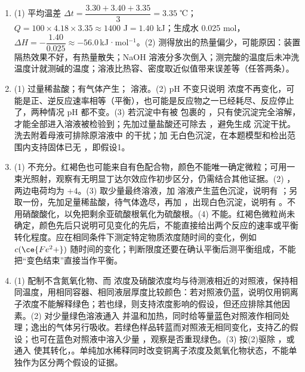 \documentclass[UTF8,a4paper,zihao=5,oneside,openany,fontset=none]{ctexbook}
\newenvironment{jiexilist}{\small\begin{enumerate}[label={\textbf{\arabic*}.},leftmargin=1.6em,itemsep=0.3em,topsep=0.2em]}{\end{enumerate}}
\newcommand{\kjmol}{\,kJ·mol$^{-1}$}
\begin{document}
\begin{jiexilist}
\item (1) 平均温差 $\Delta t=\dfrac{3.30+3.40+3.35}{3}=3.35$ ℃；$Q=100\times4.18\times3.35\approx1400$ J$=1.40$ kJ；生成水 0.025 mol，$\Delta H=-\dfrac{1.40}{0.025}\approx-56.0$\kjmol。(2) 测得放出的热量偏少，可能原因：装置隔热效果不好，有热量散失；NaOH 溶液分多次倒入；测完酸的温度后未冲洗温度计就测碱的温度；溶液比热容、密度取近似值带来误差等（任答两条）。
\item (1) 过量稀盐酸；有气体产生； 溶液。(2) pH 不变只说明  浓度不再变化，可能是正、逆反应速率相等（平衡），也可能是反应物之一已经耗尽、反应停止了，两种情况 pH 都不变。(3) 若沉淀中有被  包裹的 ，只有使沉淀完全溶解， 才能全部进入溶液被检验到；先加过量盐酸还可除去 ，避免生成  沉淀干扰。洗去附着母液可排除原溶液中  的干扰；加  无白色沉淀，在本题模型和检出范围内支持固体已无 ，即假设1。
\item (1) 不充分。红褐色也可能来自有色配合物，颜色不能唯一确定微粒；可用一束光照射，观察有无明显丁达尔效应作初步区分，仍需结合其他证据。(2) ，两边电荷均为 $+4$。(3) 取少量最终溶液，加  溶液产生蓝色沉淀，说明有 ；另取一份，先加足量稀盐酸，待气体逸尽，再加 ，出现白色沉淀，说明有 。不用硝酸酸化，以免把剩余亚硫酸根氧化为硫酸根。(4) 不能。红褐色微粒尚未确定，颜色先后只说明可见变化的先后，不能直接给出两个反应的速率或平衡转化程度。应在相同条件下测定特定物质浓度随时间的变化，例如 $c(\ce{Fe^2+})$ 随时间的变化；判断限度还要在确认平衡后测平衡组成，不能把“变色结束”直接当作平衡。
\item (1) 配制不含氮氧化物、而  浓度及硝酸浓度均与待测液相近的对照液，保持相同温度，用相同容器、相同液层厚度比较颜色：若对照液仍蓝，说明仅用铜离子浓度不能解释绿色；若也绿，则支持浓度影响的假设，但还应排除其他因素。(2) 对少量绿色溶液通入  并温和加热，同时给等量蓝色对照液作相同处理；逸出的气体另行吸收。若绿色样品转蓝而对照液无相同变化，支持乙的假设；也可在蓝色对照液中溶入少量 ，观察是否重现绿色。(3) 按(2)驱除 ，或通入  使其转化，。单纯加水稀释同时改变铜离子浓度及氮氧化物状态，不能单独作为区分两个假设的证据。
\end{jiexilist}
\end{document}
